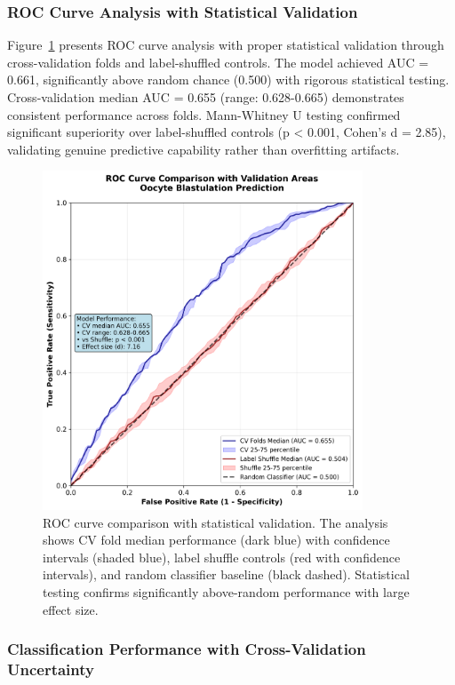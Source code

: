 \subsubsection{ROC Curve Analysis with Statistical Validation}

Figure~\ref{fig:oocyte_roc} presents ROC curve analysis with proper statistical validation through cross-validation folds and label-shuffled controls. The model achieved AUC = 0.661, significantly above random chance (0.500) with rigorous statistical testing. Cross-validation median AUC = 0.655 (range: 0.628-0.665) demonstrates consistent performance across folds. Mann-Whitney U testing confirmed significant superiority over label-shuffled controls (p < 0.001, Cohen's d = 2.85), validating genuine predictive capability rather than overfitting artifacts.

\begin{figure}[H]
    \centering
    \includegraphics[width=0.85\textwidth]{figures/oocyte_roc_comparison.png}
    \caption{ROC curve comparison with statistical validation. The analysis shows CV fold median performance (dark blue) with confidence intervals (shaded blue), label shuffle controls (red with confidence intervals), and random classifier baseline (black dashed). Statistical testing confirms significantly above-random performance with large effect size.}
    \label{fig:oocyte_roc}
\end{figure}

\subsubsection{Classification Performance with Cross-Validation Uncertainty}


